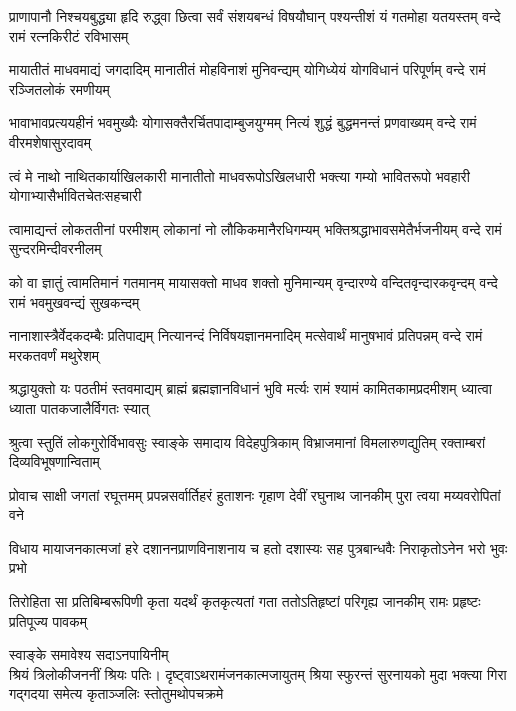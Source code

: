 \fourlineindentedshloka
{प्राणापानौ निश्चयबुद्ध्या हृदि रुद्ध्वा}
{छित्वा सर्वं संशयबन्धं विषयौघान्}
{पश्यन्तीशं यं गतमोहा यतयस्तम्}
{वन्दे रामं रत्नकिरीटं रविभासम्} %

\fourlineindentedshloka
{मायातीतं माधवमाद्यं जगदादिम्}
{मानातीतं मोहविनाशं मुनिवन्द्यम्}
{योगिध्येयं योगविधानं परिपूर्णम्}
{वन्दे रामं रञ्जितलोकं रमणीयम्} %

\fourlineindentedshloka
{भावाभावप्रत्ययहीनं भवमुख्यैः}
{योगासक्तैरर्चितपादाम्बुजयुग्मम्}
{नित्यं शुद्धं बुद्धमनन्तं प्रणवाख्यम्}
{वन्दे रामं वीरमशेषासुरदावम्} %

\fourlineindentedshloka
{त्वं मे नाथो नाथितकार्याखिलकारी}
{मानातीतो माधवरूपोऽखिलधारी}
{भक्त्या गम्यो भावितरूपो भवहारी}
{योगाभ्यासैर्भावितचेतःसहचारी} %

\fourlineindentedshloka
{त्वामाद्यन्तं लोकततीनां परमीशम्}
{लोकानां नो लौकिकमानैरधिगम्यम्}
{भक्तिश्रद्धाभावसमेतैर्भजनीयम्}
{वन्दे रामं सुन्दरमिन्दीवरनीलम्} %

\fourlineindentedshloka
{को वा ज्ञातुं त्वामतिमानं गतमानम्}
{मायासक्तो माधव शक्तो मुनिमान्यम्}
{वृन्दारण्ये वन्दितवृन्दारकवृन्दम्}
{वन्दे रामं भवमुखवन्द्यं सुखकन्दम्} %

\fourlineindentedshloka
{नानाशास्त्रैर्वेदकदम्बैः प्रतिपाद्यम्}
{नित्यानन्दं निर्विषयज्ञानमनादिम्}
{मत्सेवार्थं मानुषभावं प्रतिपन्नम्}
{वन्दे रामं मरकतवर्णं मथुरेशम्} %

\fourlineindentedshloka
{श्रद्धायुक्तो यः पठतीमं स्तवमाद्यम्}
{ब्राह्मं ब्रह्मज्ञानविधानं भुवि मर्त्यः}
{रामं श्यामं कामितकामप्रदमीशम्}
{ध्यात्वा ध्याता पातकजालैर्विगतः स्यात्} %

\fourlineindentedshloka
{श्रुत्वा स्तुतिं लोकगुरोर्विभावसुः}
{स्वाङ्के समादाय विदेहपुत्रिकाम्}
{विभ्राजमानां विमलारुणद्युतिम्}
{रक्ताम्बरां दिव्यविभूषणान्विताम्} %

\fourlineindentedshloka
{प्रोवाच साक्षी जगतां रघूत्तमम्}
{प्रपन्नसर्वार्तिहरं हुताशनः}
{गृहाण देवीं रघुनाथ जानकीम्}
{पुरा त्वया मय्यवरोपितां वने} %

\fourlineindentedshloka
{विधाय मायाजनकात्मजां हरे}
{दशाननप्राणविनाशनाय च}
{हतो दशास्यः सह पुत्रबान्धवैः}
{निराकृतोऽनेन भरो भुवः प्रभो} %

\fourlineindentedshloka
{तिरोहिता सा प्रतिबिम्बरूपिणी}
{कृता यदर्थं कृतकृत्यतां गता}
{ततोऽतिहृष्टां परिगृह्य जानकीम्}
{रामः प्रहृष्टः प्रतिपूज्य पावकम्} %

\begin{minipage}{\linewidth}
\centering%
{\hspace{-7ex}स्वाङ्के समावेश्य सदाऽनपायिनीम्}\\
{\hspace{-1ex}श्रियं त्रिलोकीजननीं श्रियः पतिः।}
\fourlineindentedshloka
{दृष्ट्वाऽथ\hspace{1.3ex}रामं\hspace{1.3ex}जनकात्मजायुतम्}
{श्रिया स्फुरन्तं सुरनायको मुदा}
{भक्त्या गिरा गद्गदया समेत्य}
{कृताञ्जलिः \hspace{1.5ex}स्तोतुमथोपचक्रमे} %
\end{minipage}

